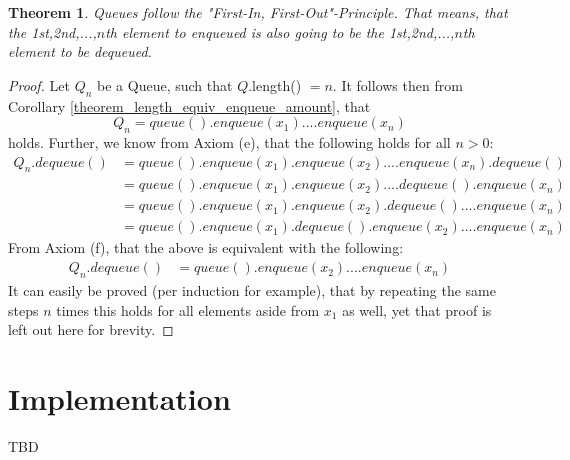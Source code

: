 \documentclass{article}
\newtheorem{theorem}{Theorem}
\begin{document}
	
\begin{theorem}
	Queues follow the "First-In, First-Out"-Principle. That means, that the 1st,2nd,...,\(n\)th element to enqueued is also going to be the 1st,2nd,...,\(n\)th element to be dequeued.
\end{theorem}
\begin{proof}
	Let \(Q_n\) be a Queue, such that \(Q\).length() \(= n\). It follows then from Corollary \ref{theorem_length_equiv_enqueue_amount}, that
	\[Q_n = queue().enqueue(x_1)....enqueue(x_n)\]
	holds. Further, we know from Axiom (e), that the following holds for all \(n > 0\):
	\begin{align*}
		Q_n.dequeue() &= queue().enqueue(x_1).enqueue(x_2)....enqueue(x_n).dequeue() \\
		&= queue().enqueue(x_1).enqueue(x_2)....dequeue().enqueue(x_n) \\
		&= queue().enqueue(x_1).enqueue(x_2).dequeue()....enqueue(x_n) \\
		&= queue().enqueue(x_1).dequeue().enqueue(x_2)....enqueue(x_n)
	\end{align*}
	From Axiom (f), that the above is equivalent with the following:
	\begin{align*}
		Q_n.dequeue() &= queue().enqueue(x_2)....enqueue(x_n)
	\end{align*}
	It can easily be proved (per induction for example), that by repeating the same steps \(n\) times this holds for all elements aside from \(x_1\) as well, yet that proof is left out here for brevity.
\end{proof}
	


\section*{Implementation}
TBD
\end{document}
